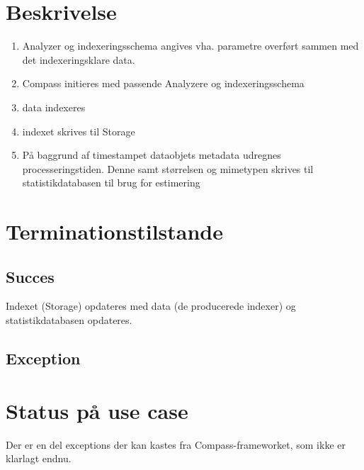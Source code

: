 \documentclass{article}
\begin{document}
\section{Beskrivelse}
\begin{enumerate}
\item Analyzer og indexeringsschema angives vha. parametre overført
  sammen med det indexeringsklare data.
\item Compass initieres med passende Analyzere og indexeringsschema
\item data indexeres
\item indexet skrives til Storage
\item På baggrund af timestampet dataobjets metadata udregnes
  processeringstiden. Denne samt størrelsen og mimetypen skrives til
  statistikdatabasen til brug for estimering
\end{enumerate}

\section{Terminationstilstande}

\subsection{Succes}
Indexet (Storage) opdateres med data (de producerede indexer) og statistikdatabasen opdateres.

\subsection{Exception}

\section{Status på use case}
Der er en del exceptions der kan kastes fra Compass-frameworket, som
ikke er klarlagt endnu.
\end{document}
